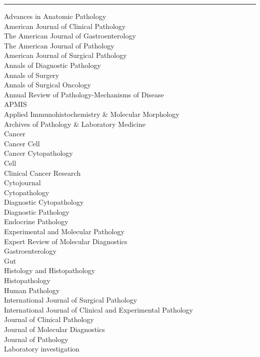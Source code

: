 \documentclass[]{article}
\begin{document}
\begin{center}\rule{0.5\linewidth}{\linethickness}\end{center}

Advances in Anatomic Pathology\\
American Journal of Clinical Pathology\\
The American Journal of Gastroenterology\\
The American Journal of Pathology\\
American Journal of Surgical Pathology\\
Annals of Diagnostic Pathology\\
Annals of Surgery\\
Annals of Surgical Oncology\\
Annual Review of Pathology-Mechanisms of Disease\\
APMIS\\
Applied Immunohistochemistry \& Molecular Morphology\\
Archives of Pathology \& Laboratory Medicine\\
Cancer\\
Cancer Cell\\
Cancer Cytopathology\\
Cell\\
Clinical Cancer Research\\
Cytojournal\\
Cytopathology\\
Diagnostic Cytopathology\\
Diagnostic Pathology\\
Endocrine Pathology\\
Experimental and Molecular Pathology\\
Expert Review of Molecular Diagnostics\\
Gastroenterology\\
Gut\\
Histology and Histopathology\\
Histopathology\\
Human Pathology\\
International Journal of Surgical Pathology\\
International Journal of Clinical and Experimental Pathology\\
Journal of Clinical Pathology\\
Journal of Molecular Diagnostics\\
Journal of Pathology\\
Laboratory investigation\\
\end{document}
